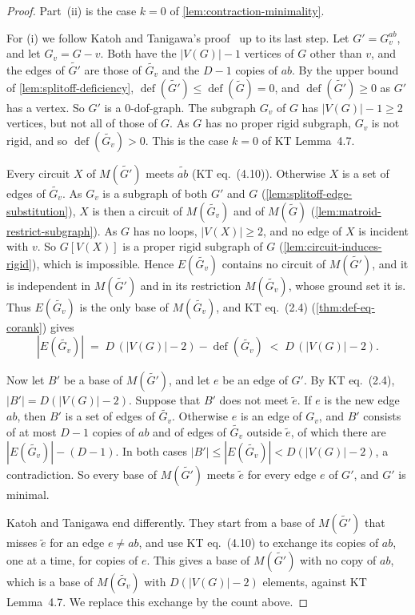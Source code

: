 \begin{proof}
  \leanok
  Part~(ii) is the case $k = 0$ of \cref{lem:contraction-minimality}.

  For (i) we follow Katoh and Tanigawa's
  proof~\cite[pp.~665--666]{katohTanigawa2011} up to its last step. Let
  $G' = G_v^{ab}$, and let $G_v = G - v$. Both have the $|V(G)| - 1$
  vertices of $G$ other than $v$, and the edges of $\widetilde{G'}$ are
  those of $\widetilde{G_v}$ and the $D - 1$ copies of $ab$. By the
  upper bound of \cref{lem:splitoff-deficiency},
  $\operatorname{def}(\widetilde{G'}) \le \operatorname{def}(\tilde G) = 0$,
  and $\operatorname{def}(\widetilde{G'}) \ge 0$ as $G'$ has a vertex. So
  $G'$ is a $0$-dof-graph. The subgraph $G_v$ of $G$ has
  $|V(G)| - 1 \ge 2$ vertices, but not all of those of $G$. As $G$ has
  no proper rigid subgraph, $G_v$ is not rigid, and so
  $\operatorname{def}(\widetilde{G_v}) > 0$. This is the case $k = 0$ of
  KT Lemma~4.7.

  Every circuit $X$ of $M(\widetilde{G'})$ meets $\widetilde{ab}$ (KT
  eq.~(4.10)). Otherwise $X$ is a set of edges of $\widetilde{G_v}$. As
  $G_v$ is a subgraph of both $G'$ and $G$
  (\cref{lem:splitoff-edge-substitution}), $X$ is then a circuit of
  $M(\widetilde{G_v})$ and of $M(\tilde G)$
  (\cref{lem:matroid-restrict-subgraph}). As $G$ has no loops,
  $|V(X)| \ge 2$, and no edge of $X$ is incident with $v$. So $G[V(X)]$
  is a proper rigid subgraph of $G$ (\cref{lem:circuit-induces-rigid}),
  which is impossible. Hence $E(\widetilde{G_v})$ contains no circuit of
  $M(\widetilde{G'})$, and it is independent in $M(\widetilde{G'})$ and
  in its restriction $M(\widetilde{G_v})$, whose ground set it is. Thus
  $E(\widetilde{G_v})$ is the only base of $M(\widetilde{G_v})$, and KT
  eq.~(2.4) (\cref{thm:def-eq-corank}) gives
  \[
    |E(\widetilde{G_v})| \;=\; D\,(|V(G)| - 2) -
    \operatorname{def}(\widetilde{G_v}) \;<\; D\,(|V(G)| - 2).
  \]

  Now let $B'$ be a base of $M(\widetilde{G'})$, and let $e$ be an edge
  of $G'$. By KT eq.~(2.4), $|B'| = D(|V(G)| - 2)$. Suppose that $B'$
  does not meet $\tilde e$. If $e$ is the new edge $ab$, then $B'$ is a
  set of edges of $\widetilde{G_v}$. Otherwise $e$ is an edge of $G_v$,
  and $B'$ consists of at most $D - 1$ copies of $ab$ and of edges of
  $\widetilde{G_v}$ outside $\tilde e$, of which there are
  $|E(\widetilde{G_v})| - (D - 1)$. In both cases
  $|B'| \le |E(\widetilde{G_v})| < D(|V(G)| - 2)$, a contradiction. So
  every base of $M(\widetilde{G'})$ meets $\tilde e$ for every edge $e$
  of $G'$, and $G'$ is minimal.

  Katoh and Tanigawa end differently. They start from a base of
  $M(\widetilde{G'})$ that misses $\tilde e$ for an edge $e \neq ab$, and
  use KT eq.~(4.10) to exchange its copies of $ab$, one at a time, for
  copies of $e$. This gives a base of $M(\widetilde{G'})$ with no copy of
  $ab$, which is a base of $M(\widetilde{G_v})$ with $D(|V(G)| - 2)$
  elements, against KT Lemma~4.7. We replace this exchange by the count
  above.
\end{proof}

